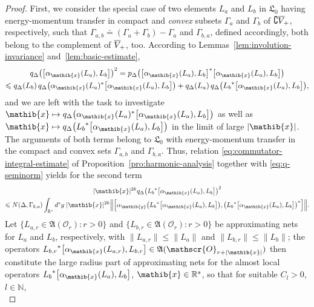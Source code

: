 \documentclass[a4paper,a4paper]{article}
\numberwithin{equation}{section}
\newcommand{\Nbb}{\mathbb{N}}
\newcommand{\Afrak}{\mathfrak{A}}
\newcommand{\Lfrak}{\mathfrak{L}}
\newcommand{\xib}{\mathib{x}}
\newcommand{\Oscr}{\mathscr{O}}
\newcommand{\Rs}{\mathbb{R}^s}
\newcommand{\fwcone}{\overline{V}_{\negthinspace +}}
\newcommand{\aibx}{\alpha_\mathib{x}}
\newcommand{\aiby}{\alpha_\mathib{y}}
\newcommand{\AOr}{\mathfrak{A} ( \mathscr{O}_r )}
\theoremstyle{definition}
\theoremstyle{plain}
\theoremstyle{remark}
\newcommand{\bset}[1]{\bigl\{ #1 \bigr\}}
\newcommand{\bcomm}[2]{\bigl[ #1 , #2 \bigr]}
\newcommand{\Bcomm}[2]{\Bigl[ #1 , #2 \Bigr]}
\newcommand{\abs}[1]{\lvert #1 \rvert}
\newcommand{\norm}[1]{\lVert #1 \rVert}
\newcommand{\Bnorm}[1]{\Bigl\lVert #1 \Bigr\rVert}
\newcommand{\bpDx}[1]{p_\Delta \bigl( #1 \bigr)}
\newcommand{\qDx}[1]{q_\Delta ( #1 )}
\newcommand{\bqDx}[1]{q_\Delta \bigl( #1 \bigr)}
\begin{document}
\begin{proof}
    First, we consider the special case of two elements $L_a$ and
    $L_b$ in $\Lfrak_0$ having energy-momentum transfer in compact and
    \emph{convex} subsets $\Gamma_a$ and $\Gamma_b$ of $\complement
    \fwcone$, respectively, such that $\Gamma_{a , b} \doteq (
    \Gamma_a + \Gamma_b ) - \Gamma_a$ and $\Gamma_{b , a}$, defined
    accordingly, both belong to the complement of $\fwcone$, too.
    According to Lemmas~\ref{lem:involution-invariance}
    and~\ref{lem:basic-estimate},
    \begin{multline}
      \label{eq:specialized-Ep-transfer-estimate}
      \bqDx{\bcomm{\aibx ( L_a )}{L_b}}^2 = \bpDx{\bcomm{\aibx ( L_a
      )}{L_b}^* \bcomm{\aibx ( L_a )}{L_b}} \\
      \leqslant \qDx{L_b} \, \bqDx{\aibx ( L_a )^* \bcomm{\aibx ( L_a
      )}{L_b}} + \qDx{L_a} \, \bqDx{{L_b}^* \bcomm{\aibx ( L_a
      )}{L_b}} \text{,}
    \end{multline}
    and we are left with the task to investigate $\xib \mapsto
    \bqDx{\aibx ( L_a )^* \bcomm{\aibx ( L_a )}{L_b}}$ as well as
    $\xib \mapsto \bqDx{{L_b}^* \bcomm{\aibx ( L_a )}{L_b}}$ in the
    limit of large $\abs{\xib}$. The arguments of both terms belong to
    $\Lfrak_0$ with energy-momentum transfer in the compact and convex
    sets $\Gamma_{a , b}$ and $\Gamma_{ b , a}$. Thus, relation
    \eqref{eq:commutator-integral-estimate} of
    Proposition~\ref{pro:harmonic-analysis} together with
    \eqref{eq:q-seminorm} yields for the second term
    \begin{multline}
      \label{eq:L0-commutator-estimate}
      \abs{\xib}^{2k} \bqDx{{L_b}^* \bcomm{\aibx ( L_a )}{L_b}}^2 \\
      \leqslant N ( \Delta , \Gamma_{b , a} ) \int_{\Rs} d^s y \;
      \abs{\xib}^{2k} \Bnorm{\Bcomm{\aiby \bigl({L_b}^* \bcomm{\aibx (
      L_a )}{L_b} \bigr)}{\bigl({L_b}^* \bcomm{\aibx ( L_a )}{L_b}
      \bigr)^*}} \text{.}
    \end{multline}
    Let $\bset{ L_{a , r} \in \AOr : r > 0}$ and $\bset{ L_{b , r} \in
    \AOr : r > 0}$ be approximating nets for $L_a$ and $L_b$,
    respectively, with $\norm{L_{a , r}} \leqslant \norm{L_a}$ and
    $\norm{L_{b , r}} \leqslant \norm{L_b}$; the operators ${L_{b ,
    r}}^* \bcomm{\aibx ( L_{a , r} )}{L_{b , r}} \in \Afrak (
    \Oscr_{r + \abs{\xib}} )$ then constitute the large radius part of
    approximating nets for the almost local operators ${L_b}^*
    \bcomm{\aibx ( L_a )}{L_b}$, $\xib \in \Rs$, so that for suitable
    $C_l > 0$, $l \in \Nbb$,
    \begin{equation}

\end{equation}
\end{proof}
\end{document}
